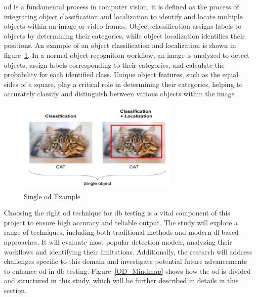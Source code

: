 \gls{od} is a fundamental process in computer vision, it is defined as the process of integrating object classification and localization to identify and locate multiple objects within an image or video frames. Object classification assigns labels to objects by determining their categories, while object localization identifies their positions. An example of an object classification and localization is shown in figure~\ref{Single_object}. In a normal object recognition workflow, an image is analyzed to detect objects, assign labels corresponding to their categories, and calculate the probability for each identified class. Unique object features, such as the equal sides of a square, play a critical role in determining their categories, helping to accurately classify and distinguish between various objects within the image \cite{oD_Review}.

\begin{figure}[ht]
    \centering
    \includegraphics[width=0.7\textwidth]{Figures/Object_detection.PNG} 
    \caption{Single \gls{od} Example \cite{oD_Review}}
    \label{Single_object}
\end{figure}

Choosing the right \gls{od} technique for \gls{db} testing is a vital component of this project to ensure high accuracy and reliable output. The study will explore a range of techniques, including both traditional methods and modern \gls{dl}-based approaches. It will evaluate most popular detection models, analyzing their workflows and identifying their limitations. Additionally, the research will address challenges specific to this domain and investigate potential future advancements to enhance \gls{od} in \gls{db} testing. Figure~\ref{OD_Mindmap} shows how the \gls{od} is divided and structured in this study, which will be further described in details in this section.

